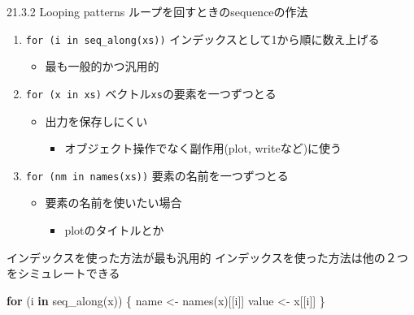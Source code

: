 \documentclass[
  ignorenonframetext,
  aspectratio=169]{beamer}
\newenvironment{Shaded}{\begin{snugshade}}{\end{snugshade}}
\newcommand{\ControlFlowTok}[1]{\textcolor[rgb]{0.13,0.29,0.53}{\textbf{#1}}}
\newcommand{\FunctionTok}[1]{\textcolor[rgb]{0.00,0.00,0.00}{#1}}
\newcommand{\NormalTok}[1]{#1}
\newcommand{\OtherTok}[1]{\textcolor[rgb]{0.56,0.35,0.01}{#1}}
\providecommand{\tightlist}{%
  \setlength{\itemsep}{0pt}\setlength{\parskip}{0pt}}
\begin{document}
\begin{frame}[fragile]{21.3.2 Looping patterns}
\protect\hypertarget{looping-patterns}{}
ループを回すときのsequenceの作法

\begin{enumerate}
\tightlist
\item
  \texttt{for\ (i\ in\ seq\_along(xs))}
  インデックスとして1から順に数え上げる

  \begin{itemize}
  \tightlist
  \item
    最も一般的かつ汎用的
  \end{itemize}
\item
  \texttt{for\ (x\ in\ xs)} ベクトル\texttt{xs}の要素を一つずつとる

  \begin{itemize}
  \tightlist
  \item
    出力を保存しにくい

    \begin{itemize}
    \tightlist
    \item
      オブジェクト操作でなく副作用(plot, writeなど)に使う
    \end{itemize}
  \end{itemize}
\item
  \texttt{for\ (nm\ in\ names(xs))} 要素の名前を一つずつとる

  \begin{itemize}
  \tightlist
  \item
    要素の名前を使いたい場合

    \begin{itemize}
    \tightlist
    \item
      plotのタイトルとか
    \end{itemize}
  \end{itemize}
\end{enumerate}
\end{frame}

\begin{frame}[fragile]{インデックスを使った方法が最も汎用的}
\protect\hypertarget{ux30a4ux30f3ux30c7ux30c3ux30afux30b9ux3092ux4f7fux3063ux305fux65b9ux6cd5ux304cux6700ux3082ux6c4eux7528ux7684}{}
インデックスを使った方法は他の２つをシミュレートできる

\begin{Shaded}
\begin{Highlighting}[]
\ControlFlowTok{for}\NormalTok{ (i }\ControlFlowTok{in} \FunctionTok{seq\_along}\NormalTok{(x)) \{}
\NormalTok{  name }\OtherTok{\textless{}{-}} \FunctionTok{names}\NormalTok{(x)[[i]]}
\NormalTok{  value }\OtherTok{\textless{}{-}}\NormalTok{ x[[i]]}
\NormalTok{\}}
\end{Highlighting}
\end{Shaded}
\end{frame}
\end{document}
